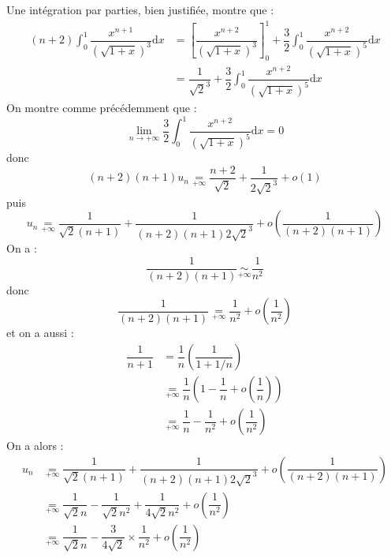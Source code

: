 \documentclass[a4paper,twoside,french,10pt]{VcCours}
\newcommand{\dx}{\text{d}x}
\begin{document}
\begin{enumerate}
\begin{enumerate}
  
  Une intégration par parties, bien justifiée, montre que :
  \begin{align*}
  (n+2) \int_0^1 \dfrac{x^{n+1}}{(\sqrt{1+x})^3} \dx & = \left[ \dfrac{x^{n+2}}{(\sqrt{1+x})^3} \right]_0^1 + \dfrac{3}{2} \int_0^1 \dfrac{x^{n+2}}{(\sqrt{1+x})^5} \dx \\
  & = \dfrac{1}{\sqrt{2}^3} + \dfrac{3}{2} \int_0^1 \dfrac{x^{n+2}}{(\sqrt{1+x})^5} \dx 
  \end{align*}
  On montre comme précédemment que :
  $$ \lim_{n \rightarrow + \infty} \dfrac{3}{2} \int_0^1 \dfrac{x^{n+2}}{(\sqrt{1+x})^5} \dx  = 0$$
  donc 
  $$ (n+2)(n+1)u_n \underset{+ \infty}{=}  \dfrac{n+2}{\sqrt{2}} + \dfrac{1}{2\sqrt{2}^3} + o(1) $$
  puis
  $$ u_n \underset{+ \infty}{=} \dfrac{1}{\sqrt{2}(n+1)}  +  \dfrac{1}{(n+2)(n+1)2\sqrt{2}^3} + o \left(\dfrac{1}{(n+2)(n+1)} \right)$$
  On a :
  $$  \dfrac{1}{(n+2)(n+1)} \underset{+ \infty}{\sim} \dfrac{1}{n^2}$$
  donc 
  $$ \dfrac{1}{(n+2)(n+1)} \underset{+ \infty}{=} \dfrac{1}{n^2} + o \left( \dfrac{1}{n^2} \right)$$
  et on a aussi :
  \begin{align*}
  \dfrac{1}{n+1} & = \dfrac{1}{n} \left( \dfrac{1}{1+1/n} \right) \\
  &  \underset{+ \infty}{=}  \dfrac{1}{n} \left( 1- \dfrac{1}{n} + o \left( \dfrac{1}{n} \right) \right) \\
  & \underset{+ \infty}{=} \dfrac{1}{n} - \dfrac{1}{n^2} +  o \left( \dfrac{1}{n^2} \right)
  \end{align*}
  On a alors :
  \begin{align*}
  u_n & \underset{+ \infty}{=} \dfrac{1}{\sqrt{2}(n+1)}  +  \dfrac{1}{(n+2)(n+1)2\sqrt{2}^3} + o \left(\dfrac{1}{(n+2)(n+1)} \right) \\
  &  \underset{+ \infty}{=} \dfrac{1}{\sqrt{2}n} - \dfrac{1}{\sqrt{2} n^2}  + \dfrac{1}{4\sqrt{2}n^2}  +  o \left(\dfrac{1}{n^2} \right) \\
  &  \underset{+ \infty}{=} \dfrac{1}{\sqrt{2}n} - \dfrac{3}{4\sqrt{2}} \times \dfrac{1}{n^2} +  o \left(\dfrac{1}{n^2} \right) 
  \end{align*}
  
  \end{enumerate}
  \end{enumerate}
\end{document}
